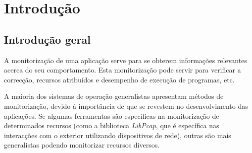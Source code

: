 \chapter{Introdução}\label{cap:introducao}




\section{Introdução geral} \label{sect:introducao}

A monitorização de uma aplicação serve para se obterem informações relevantes acerca do seu comportamento.
Esta monitorização pode servir para verificar a correcção, recursos atribuídos e desempenho de execução de programas, etc.

A maioria dos sistemas de operação generalistas apresentam métodos de monitorização, devido à importância de que se revestem no desenvolvimento das aplicações.
Se algumas ferramentas são específicas na monitorização de determinados recursos (como a biblioteca \textit{LibPcap}, que é específica nas interacções com o exterior utilizando dispositivos de rede), outras são mais generalistas podendo monitorizar recursos diversos.

